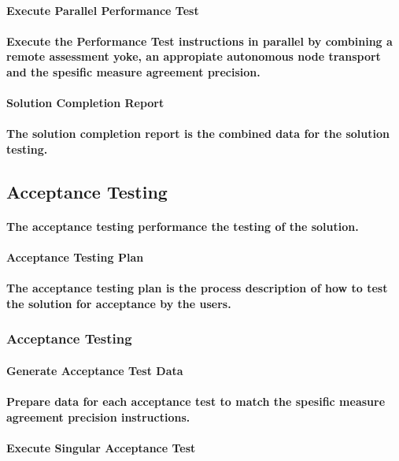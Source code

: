 \documentclass{acm_proc_article-sp}
\begin{document}
\paragraph{Execute Parallel Performance Test}
\paragraph{Execute the Performance Test instructions in parallel by combining a remote assessment yoke, an appropiate autonomous node transport and the spesific measure agreement precision.}
\paragraph{Solution Completion Report}
\paragraph{The solution completion report is the combined data for the solution testing.}
\subsection{Acceptance Testing}
\paragraph{The acceptance testing performance the testing of the solution.}
\paragraph{Acceptance Testing Plan}
\paragraph{The acceptance testing plan is the process description of how to test the solution for acceptance by the users.}
\subsubsection{Acceptance Testing}
\paragraph{Generate Acceptance Test Data}
\paragraph{Prepare data for each acceptance test to match the spesific measure agreement precision instructions.}
\paragraph{Execute Singular Acceptance Test}
\end{document}
